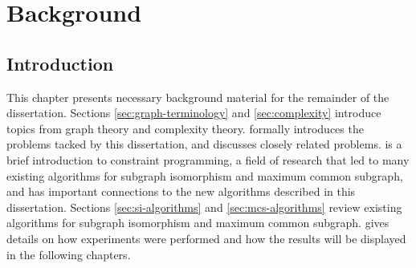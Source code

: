 \chapter{Background}
\label{c:background}

\newcommand{\FourQueens}[2] {
  \begin{tikzpicture}[scale=0.6, every node/.style={black,scale=0.9}]
    \newcommand*{\xMin}{0}%
    \newcommand*{\xMax}{3}%
    \newcommand*{\yMin}{0}%
    \newcommand*{\yMax}{3}%
    \foreach \i / \label in {0/a,1/b,2/c,3/d} {
        \draw [] node at (\i+.5,\yMin-.3) {$\label$};
    }
    \foreach \i / \label in {0/1,1/2,2/3,3/4} {
        \draw [] node at (\xMin-.3,\i+.5) {$\label$};
    }

    \foreach \y in {0,2}{
        \foreach \x in {0,2}{
            \fill[black!8] (\x,\y) rectangle (1+\x,1+\y) rectangle (2+\x,2+\y);}}
    \draw [step=1.0] (0,0) grid (4,4);
    \foreach \x/\y/\m in {#2}
        \draw [] node at (\x,\y) {\m};
    \node[draw,circle,inner sep=1mm] at (-1.4,3.5) {#1};
  \end{tikzpicture}
}

\newcommand{\MCSDomains}[2] {
  \begin{tikzpicture}[scale=0.6, every node/.style={black,scale=0.9}]
    \newcommand*{\xMin}{0}%
    \newcommand*{\xMax}{5}%
    \newcommand*{\yMin}{0}%
    \newcommand*{\yMax}{4}%
    \foreach \i / \label in {0/a,1/b,2/c,3/d,4/e,5/f} {
        \draw [] node at (\i+.5,\yMax+1.4) {$\label$};
    }
    \foreach \i / \label in {4/1,3/2,2/3,1/4,0/5} {
        \draw [] node at (\xMin-.3,\i+.5) {$\label$};
    }

    \draw [step=1.0] (0,0) grid (6,5);
    \foreach \x/\y/\m in {#2}
        \draw [] node at (\x,\y) {\m};
    \node[draw,circle,inner sep=1mm] at (-1.4,3.5) {#1};
  \end{tikzpicture}
}

\section{Introduction}

This chapter presents
necessary background material for the remainder of the dissertation.
Sections \ref{sec:graph-terminology} and
\ref{sec:complexity} introduce topics from graph theory and complexity theory.
 formally introduces the problems tacked by this
dissertation, and  discusses closely related
problems.   is a brief introduction to constraint programming, a
field of research that led to many existing algorithms for subgraph isomorphism
and maximum common subgraph, and has important connections to the new
algorithms described in this dissertation.  Sections \ref{sec:si-algorithms}
and \ref{sec:mcs-algorithms} review existing algorithms for subgraph
isomorphism and maximum common subgraph.   gives
details on how experiments were performed and how the results will be displayed
in the following chapters.

